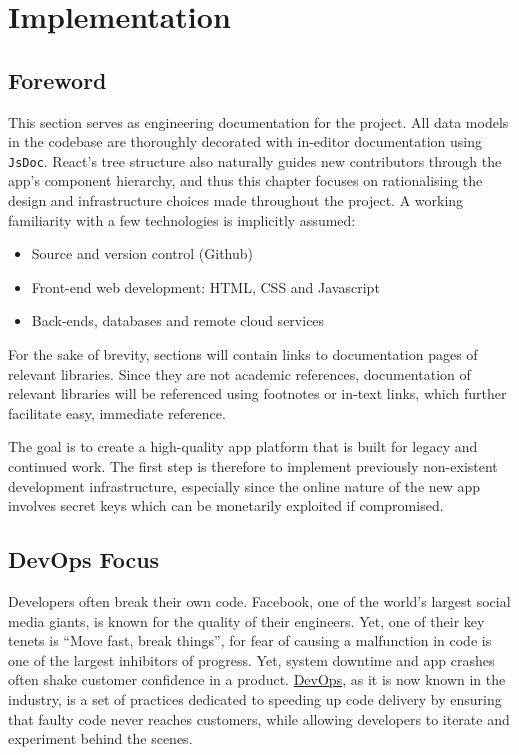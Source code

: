 \chapter{Implementation}
\section{Foreword}
This section serves as engineering documentation for the project. All data models in the codebase are thoroughly decorated with in-editor documentation using \texttt{JsDoc}. React's tree structure also naturally guides new contributors through the app's component hierarchy, and thus this chapter focuses on rationalising the design and infrastructure choices made throughout the project. A working familiarity with a few technologies is implicitly assumed:

\begin{itemize}
    \item Source and version control (Github)
    \item Front-end web development: HTML, CSS and Javascript
    \item Back-ends, databases and remote cloud services
\end{itemize}

For the sake of brevity, sections will contain links to documentation pages of relevant libraries. Since they are not academic references, documentation of relevant libraries will be referenced using footnotes or in-text links, which further facilitate easy, immediate reference.

The goal is to create a high-quality app platform that is built for legacy and continued work. The first step is therefore to implement previously non-existent development infrastructure, especially since the online nature of the new app involves secret keys which can be monetarily exploited if compromised.

\section{DevOps Focus}
Developers often break their own code. Facebook, one of the world's largest social media giants, is known for the quality of their engineers. Yet, one of their key tenets is ``Move fast, break things'', for fear of causing a malfunction in code is one of the largest inhibitors of progress. Yet, system downtime and app crashes often shake customer confidence in a product. \href{https://aws.amazon.com/devops/what-is-devops/}{DevOps}, as it is now known in the industry, is a set of practices dedicated to speeding up code delivery by ensuring that faulty code never reaches customers, while allowing developers to iterate and experiment behind the scenes.

